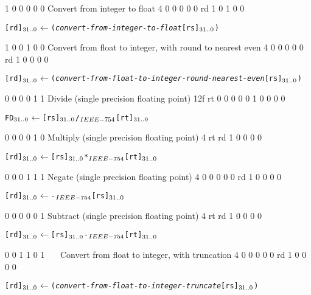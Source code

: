  {1 0 0 0 0 0} {Convert from integer to float} {4} {\RawTag} {0 0 0 0 0} {rd} {1 0 1 0 0}
\begin{alltt}
        [rd]\({\sb{31..0}}\) \(\leftarrow\) ({\em{convert-from-integer-to-float}} [rs]\({\sb{31..0}}\))
\end{alltt}\rawInstrEnd

 {1 0 0 1 0 0} {Convert from float to integer, with round to nearest even} {4} {\RawTag} {0 0 0 0 0} {rd} {1 0 0 0 0}
\begin{alltt}
        [rd]\({\sb{31..0}}\) \(\leftarrow\) ({\em{convert-from-float-to-integer-round-nearest-even}} [rs]\({\sb{31..0}}\))
\end{alltt}\rawInstrEnd

 {0 0 0 0 1 1} {Divide (single precision floating point)} {12f} {\RawTag} {rt} {0 0 0 0 0} {1 0 0 0 0}
\begin{alltt}
        FD\({\sb{31..0}}\) \(\leftarrow\) [rs]\({\sb{31..0}}\) /\(\sb{IEEE-754}\) [rt]\({\sb{31..0}}\)
\end{alltt}\rawInstrEnd

 {0 0 0 0 1 0} {Multiply (single precision floating point)} {4} {\RawTag} {rt} {rd} {1 0 0 0 0}
\begin{alltt}
        [rd]\({\sb{31..0}}\) \(\leftarrow\) [rs]\({\sb{31..0}}\) *\(\sb{IEEE-754}\) [rt]\({\sb{31..0}}\)
\end{alltt}\rawInstrEnd

 {0 0 0 1 1 1} {Negate (single precision floating point)} {4} {\RawTag} {0 0 0 0 0} {rd} {1 0 0 0 0}
\begin{alltt}
        [rd]\({\sb{31..0}}\) \(\leftarrow\) -\(\sb{IEEE-754}\) [rs]\({\sb{31..0}}\)
\end{alltt}\rawInstrEnd

 {0 0 0 0 0 1} {Subtract (single precision floating point)} {4} {\RawTag} {rt} {rd} {1 0 0 0 0}
\begin{alltt}
        [rd]\({\sb{31..0}}\) \(\leftarrow\) [rs]\({\sb{31..0}}\) -\(\sb{IEEE-754}\) [rt]\({\sb{31..0}}\)
\end{alltt}\rawInstrEnd

 {0 0 1 1 0 1} {~~~Convert from float to integer, with truncation} {4} {\RawTag} {0 0 0 0 0} {rd} {1 0 0 0 0}
\begin{alltt}
        [rd]\({\sb{31..0}}\) \(\leftarrow\) ({\em{convert-from-float-to-integer-truncate}} [rs]\({\sb{31..0}}\))
\end{alltt}\rawInstrEnd

